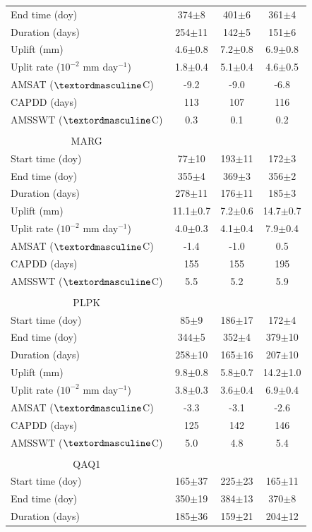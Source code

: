 \begin{center}
\begin{ThreePartTable}
\begin{longtable}{lccc}
End time (doy)&374$\pm$8&401$\pm$6&361$\pm$4\\
Duration (days)&254$\pm$11&142$\pm$5&151$\pm$6\\
Uplift (mm)&4.6$\pm$0.8&7.2$\pm$0.8&6.9$\pm$0.8\\
Uplit rate ($10^{-2}$ mm day$^{-1}$)&1.8$\pm$0.4&5.1$\pm$0.4&4.6$\pm$0.5\\
AMSAT ($\textordmasculine$C)&-9.2&-9.0&-6.8\\
CAPDD (days)&113&107&116\\
AMSSWT ($\textordmasculine$C)&0.3&0.1&0.2\\
&  &  & \\
\multicolumn{1}{c}{MARG} & & & \\
Start time (doy)&77$\pm$10&193$\pm$11&172$\pm$3\\
End time (doy)&355$\pm$4&369$\pm$3&356$\pm$2\\
Duration (days)&278$\pm$11&176$\pm$11&185$\pm$3\\
Uplift (mm)&11.1$\pm$0.7&7.2$\pm$0.6&14.7$\pm$0.7\\
Uplit rate ($10^{-2}$ mm day$^{-1}$)&4.0$\pm$0.3&4.1$\pm$0.4&7.9$\pm$0.4\\
AMSAT ($\textordmasculine$C)&-1.4&-1.0&0.5\\
CAPDD (days)&155&155&195\\
AMSSWT ($\textordmasculine$C)&5.5&5.2&5.9\\
&  &  & \\
\multicolumn{1}{c}{PLPK} & & & \\
Start time (doy)&85$\pm$9&186$\pm$17&172$\pm$4\\
End time (doy)&344$\pm$5&352$\pm$4&379$\pm$10\\
Duration (days)&258$\pm$10&165$\pm$16&207$\pm$10\\
Uplift (mm)&9.8$\pm$0.8&5.8$\pm$0.7&14.2$\pm$1.0\\
Uplit rate ($10^{-2}$ mm day$^{-1}$)&3.8$\pm$0.3&3.6$\pm$0.4&6.9$\pm$0.4\\
AMSAT ($\textordmasculine$C)&-3.3&-3.1&-2.6\\
CAPDD (days)&125&142&146\\
AMSSWT ($\textordmasculine$C)&5.0&4.8&5.4\\
&  &  & \\	
\multicolumn{1}{c}{QAQ1} & & & \\
Start time (doy)&165$\pm$37&225$\pm$23&165$\pm$11\\
End time (doy)&350$\pm$19&384$\pm$13&370$\pm$8\\
Duration (days)&185$\pm$36&159$\pm$21&204$\pm$12\\

\end{longtable}
\end{ThreePartTable}
\end{center}
